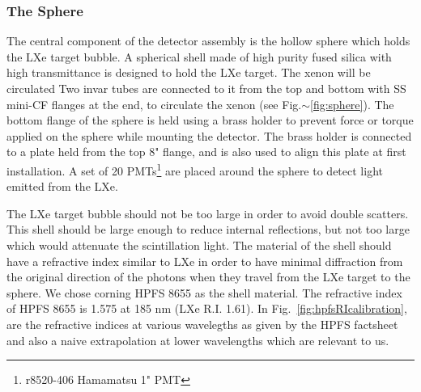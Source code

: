 \subsubsection{The Sphere}
\label{subsubsec:sphere}

The central component of the detector assembly is the hollow sphere which holds the LXe target bubble. A spherical 
shell made of high purity fused silica with high transmittance is designed to hold the LXe target.
 The xenon will be circulated Two invar tubes are connected to it from the top and bottom with 
SS mini-CF flanges at the end, to circulate the xenon (see Fig.$\sim$\ref{fig:sphere}). 
The bottom flange of the sphere is held using a brass holder to prevent force or torque applied on the sphere while mounting the detector. The 
brass holder is connected to a plate held from the top 8" flange, and is also used to align this plate at first installation.
A set of 20 PMTs\footnote{r8520-406 Hamamatsu 1" PMT} are placed around the sphere to detect light emitted 
from the LXe.


The LXe target bubble should not be too large in order to avoid double scatters. This shell should be large enough to 
reduce internal reflections, but not too large which would attenuate the scintillation light. The material of the shell 
should have a refractive index similar to LXe in order to have minimal 
diffraction from the original direction of the photons when they travel from the LXe target to the sphere. 
We chose corning HPFS 8655 as the shell material. The refractive index of HPFS 8655 is 1.575 at 185 nm (LXe R.I. 1.61). 
 In Fig.~\ref{fig:hpfsRIcalibration}, 
are the refractive indices at various wavelegths as given by the HPFS factsheet and also a naive extrapolation at lower 
wavelengths which are relevant to us. %

